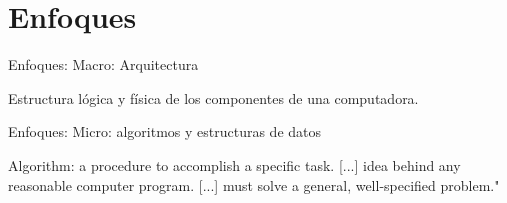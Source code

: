 \section{Enfoques}

\begin{frame}{Enfoques: Macro: Arquitectura}
\begin{block}{\cite{Asale2022Mar}}
    \begin{quoting} Estructura lógica y física de los componentes de una computadora. \end{quoting}
\end{block}
\end{frame}

\begin{frame}{Enfoques: Micro: algoritmos y estructuras de datos}
    \begin{block}{\cite{skiena_2012}}
        Algorithm: a procedure to accomplish a specific task. [...] idea behind any reasonable computer program. [...] must solve a general, well-specified problem."
    \end{block}
\end{frame}